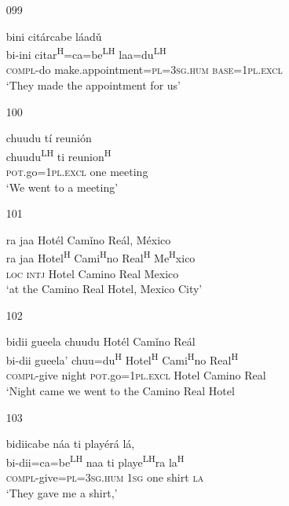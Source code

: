 \begin{itemize}
\item[099]
 
\glll   bini cit\'{a}rcabe l\'{a}ad\v{u}\\
bi-ini citar\textsuperscript{H}=ca=be\textsuperscript{LH}  laa=du\textsuperscript{LH} \\
\textsc{compl}-do make.appointment=\textsc{pl}=\textsc{3sg.hum} \textsc{base}=\textsc{1pl.excl}\\
\glt `They made the appointment for us' 
 


\item[100]
 
\glll   chuudu t\'{i} reuni\'{o}n\\
chuudu\textsuperscript{LH}  ti reunion\textsuperscript{H} \\
\textsc{pot}.go=\textsc{1pl.excl} one meeting\\
\glt `We went to a meeting'
 

\item[101]
 
\glll   ra jaa Hot\'{e}l Cam\v{i}no Re\'{a}l, M\'{e}xico\\
 ra jaa Hotel\textsuperscript{H} Cami\textsuperscript{H}no Real\textsuperscript{H} Me\textsuperscript{H}xico\\
 \textsc{loc} \textsc{intj} Hotel Camino Real Mexico\\
\glt `at the Camino Real Hotel, Mexico City'
 


\item[102]

\glll   bidii gueela chuudu Hot\'{e}l Cam\v{i}no Re\'{a}l \\
 bi-dii gueela' chuu=du\textsuperscript{H} Hotel\textsuperscript{H} Cami\textsuperscript{H}no Real\textsuperscript{H}\\ 
 \textsc{compl}-give night  \textsc{pot}.go=\textsc{1pl.excl} Hotel Camino Real \\
\glt `Night came we went to the Camino Real Hotel
 

\item[103]
 
\glll   bidiicabe n\'{a}a ti play\'{e}r\'{a} l\'{a},\\
bi-dii=ca=be\textsuperscript{LH} naa ti playe\textsuperscript{LH}ra la\textsuperscript{H}\\
 \textsc{compl}-give=\textsc{pl}=\textsc{3sg.hum} \textsc{1sg} one shirt \textsc{la}\\
\glt `They gave me a shirt,'
 



\end{itemize}
